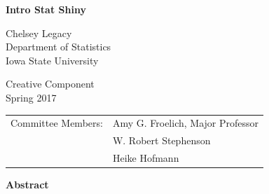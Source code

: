 \documentclass[11pt]{book}
\begin{document}
\begin{titlepage}
    \begin{center}
                
        \Large
        \textbf{Intro Stat Shiny}
        
      
        \vspace{1cm}
       
        
        \Large
        Chelsey Legacy \\
        \vspace{0.25cm}
        Department of Statistics\\
          \vspace{0.25cm}
        Iowa State University\\
       
        
        \vspace{1cm}
               
           Creative Component\\
             \vspace{0.25cm}
           Spring 2017
           
           \vspace{2cm}
         
				\begin{center}
				\begin{tabular}{rl}
				Committee Members: & Amy G. Froelich, Major Professor\\
				 & W. Robert Stephenson \\
				 & Heike Hofmann\\
				\end{tabular}
				\end{center}
           
    \end{center}
\end{titlepage}







\begin{center}
\textbf{Abstract}
\end{center}
\newpage
\tableofcontents
\renewcommand\thechapter{\arabic{chapter}}
\renewcommand\thesection{\arabic{section}}

\newpage
\end{document}
